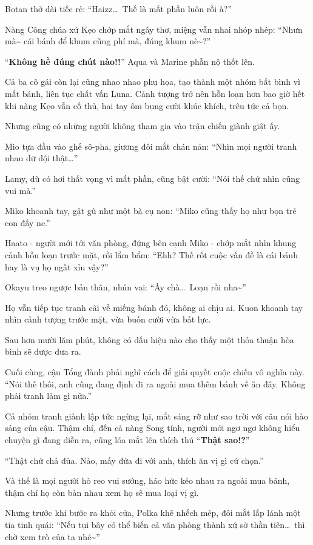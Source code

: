 \documentclass[../main.tex]{subfiles}
\begin{document}
Botan thở dài tiếc rẻ: ``Haizz\dots\ Thế là mất phần luôn rồi à?''

Nàng Công chúa xứ Kẹo chớp mắt ngây thơ, miệng vẫn nhai nhóp nhép: ``Nhưn mà\~{} cái bánh để khum cũng phí mà, đúng khum nè\~{}?''

``\textbf{Không hề đúng chút nào!!}'' Aqua và Marine phẫn nộ thốt lên.

Cả ba cô gái còn lại cũng nhao nhao phụ họa, tạo thành một nhóm bất bình vì mất bánh, liên tục chất vấn Luna. Cảnh tượng trở nên hỗn loạn hơn bao giờ hết khi nàng Kẹo vẫn cố thủ, hai tay ôm bụng cười khúc khích, trêu tức cả bọn.

Nhưng cũng có những người không tham gia vào trận chiến giành giật ấy.

Mio tựa đầu vào ghế sô-pha, giương đôi mắt chán nản: ``Nhìn mọi người tranh nhau dữ dội thật\dots''

Lamy, dù có hơi thất vọng vì mất phần, cũng bật cười: ``Nói thế chứ nhìn cũng vui mà.''

Miko khoanh tay, gật gù như một bà cụ non: ``Miko cũng thấy họ như bọn trẻ con đấy ne.''

Haato - người mới tới văn phòng, đứng bên cạnh Miko - chớp mắt nhìn khung cảnh hỗn loạn trước mặt, rồi lẩm bẩm: ``Ehh? Thế rốt cuộc vấn đề là cái bánh hay là vụ họ ngất xỉu vậy?''

Okayu treo ngược bản thân, nhún vai: ``Ây chà\dots\ Loạn rồi nha\~{}''

Họ vẫn tiếp tục tranh cãi về miếng bánh đó, không ai chịu ai. Kuon khoanh tay nhìn cảnh tượng trước mặt, vừa buồn cười vừa bất lực.

Sau hơn mười lăm phút, không có dấu hiệu nào cho thấy một thỏa thuận hòa bình sẽ được đưa ra.

Cuối cùng, cậu Tổng đành phải nghĩ cách để giải quyết cuộc chiến vô nghĩa này. ``Nói thế thôi, anh cũng đang định đi ra ngoài mua thêm bánh về ăn đây. Không phải tranh làm gì nữa.''

Cả nhóm tranh giành lập tức ngừng lại, mắt sáng rỡ như sao trời với câu nói hào sảng của cậu. Thậm chí, đến cả nàng Song tính, người mới ngơ ngơ không hiểu chuyện gì đang diễn ra, cũng lóa mắt lên thích thú ``\textbf{Thật sao!?}''

``Thật chứ chả đùa. Nào, mấy đứa đi với anh, thích ăn vị gì cứ chọn.''

Và thế là mọi người hò reo vui sướng, háo hức kéo nhau ra ngoài mua bánh, thậm chí họ còn bàn nhau xem họ sẽ mua loại vị gì.

Nhưng trước khi bước ra khỏi cửa, Polka khẽ nhếch mép, đôi mắt lấp lánh một tia tinh quái: ``Nếu tụi bây có thể biến cả văn phòng thành xứ sở thần tiên\dots\ thì chờ xem trò của ta nhé\~{}''
\end{document}
